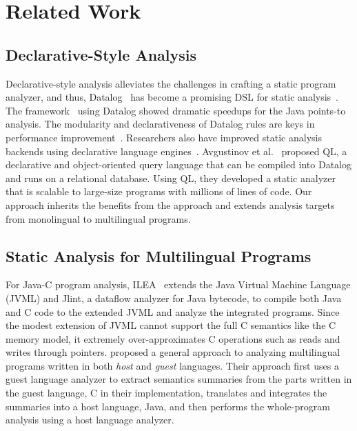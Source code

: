 \section{Related Work}\label{sec:related}

\subsection{Declarative-Style Analysis}
Declarative-style analysis alleviates the challenges in crafting a static program
analyzer, and thus, Datalog~\cite{allen2015D, allen2015stagedD, alpuente2010D,
doop, dawson1996D, naik2006D, reps1994D, smaragdakis2014D, whaley2005D} has
become a promising DSL for static analysis~\cite{scholz2016}.
The \doop framework~\cite{doop} using Datalog showed
dramatic speedups for the Java points-to analysis.  The
modularity and declarativeness of Datalog rules are keys in performance
improvement~\cite{doopWorkshop}.  Researchers also have improved static
analysis backends using declarative language engines~\cite{whaley2005D,
hoder2011muz, souffle, madsen2016}.  Avgustinov et al.~\cite{ql2016} proposed
QL, a declarative and object-oriented query language that can be compiled into
Datalog and runs on a relational database. Using QL, they developed a static
analyzer that is scalable to large-size programs with millions of lines of
code.  Our approach inherits the benefits from the approach and
extends analysis targets from monolingual to multilingual programs.

\subsection{Static Analysis for Multilingual Programs}
For Java-C program analysis, ILEA~\cite{ILEA} extends
the Java Virtual Machine Language (JVML) and Jlint, a dataflow analyzer for
Java bytecode, to compile both Java and C code to the extended JVML and analyze
the integrated programs.  Since the modest extension of JVML cannot
support the full C semantics like the C memory model, it extremely over-approximates C
operations such as reads and writes through pointers.  \citet{LeeASE20}
proposed a general approach to analyzing multilingual programs written in both
{\it host} and {\it guest} languages.  Their approach first uses a guest
language analyzer to extract semantics summaries from the parts written in the
guest language, C in their implementation, translates and integrates the
summaries into a host language, Java, and then performs the whole-program
analysis using a host language analyzer. 

